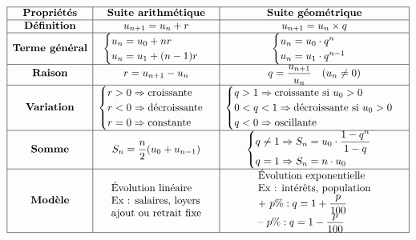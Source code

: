 


\begin{proposition}
\[\begin{array}{|c|c|c|}
\hline
\textbf{Propriétés} & \textbf{Suite arithmétique} & \textbf{Suite géométrique} \\
\hline
\textbf{Définition} & u_{n+1} = u_n + r & u_{n+1} = u_n \times q \\
\hline
\textbf{Terme général} & 
\begin{cases}
u_n = u_0 + n r \\
u_n = u_1 + (n-1)r
\end{cases}
& 
\begin{cases}
u_n = u_0 \cdot q^n \\
u_n = u_1 \cdot q^{n-1}
\end{cases}
\\
\hline
\textbf{Raison} & r = u_{n+1} - u_n & q = \dfrac{u_{n+1}}{u_n} \quad (u_n \ne 0) \\
\hline
\textbf{Variation} & 
\begin{cases}
r > 0 \Rightarrow \text{croissante} \\
r < 0 \Rightarrow \text{décroissante} \\
r = 0 \Rightarrow \text{constante}
\end{cases}
&
\begin{cases}
q > 1 \Rightarrow \text{croissante si } u_0 > 0 \\
0 < q < 1 \Rightarrow \text{décroissante si } u_0 > 0 \\
q < 0 \Rightarrow \text{oscillante}
\end{cases}
\\
\hline
\textbf{Somme} & 
S_n = \dfrac{n}{2} (u_0 + u_{n-1}) 
& 
\begin{cases}
q \ne 1 \Rightarrow S_n = u_0 \cdot \dfrac{1 - q^n}{1 - q} \\
q = 1 \Rightarrow S_n = n \cdot u_0
\end{cases}
\\
\hline
\textbf{Modèle} &
\begin{array}{l}
\text{Évolution linéaire} \\
\text{Ex : salaires, loyers} \\
\text{ajout ou retrait fixe}
\end{array}
&
\begin{array}{l}
\text{Évolution exponentielle} \\
\text{Ex : intérêts, population} \\
\text{+ }p\% : q = 1 + \dfrac{p}{100} \\
\text{– }p\% : q = 1 - \dfrac{p}{100}
\end{array}
\\
\hline
\end{array}
\]

\end{proposition}


